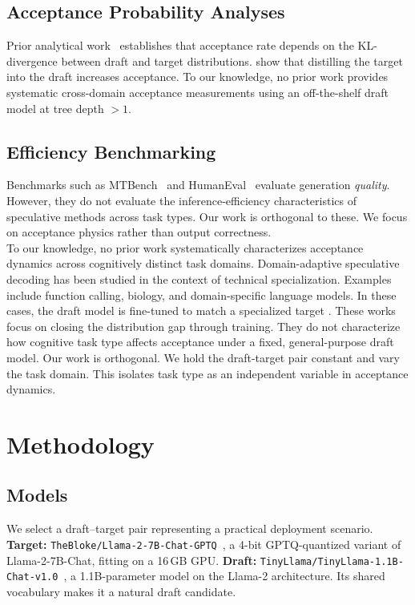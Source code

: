\documentclass[conference]{IEEEtran}
\begin{document}
\subsection{Acceptance Probability Analyses}
Prior analytical work~\cite{leviathan2023,stern2018blockwise} establishes
that acceptance rate depends on the KL-divergence between draft and target
distributions. \citet{zhou2024distillspec} show that distilling the target
into the draft increases acceptance. To our knowledge, no prior work provides
systematic cross-domain acceptance measurements using an off-the-shelf draft
model at tree depth $> 1$.

\subsection{Efficiency Benchmarking}
Benchmarks such as MTBench~\cite{zheng2023judging} and HumanEval~\cite{chen2021evaluating} evaluate generation \emph{quality}. However, they do not evaluate the inference-efficiency characteristics of speculative methods across task types. Our work is orthogonal to these. We focus on acceptance physics rather than output correctness.
\\

To our knowledge, no prior work systematically characterizes acceptance dynamics
across cognitively distinct task domains. Domain-adaptive speculative decoding has been studied in the context of technical specialization. Examples include function calling, biology, and domain-specific language models. In these cases, the draft model is fine-tuned to match a specialized target \cite{hu2025training}. These works focus on closing the distribution gap through training. They do not characterize how cognitive task type affects acceptance under a fixed, general-purpose draft model. Our work is orthogonal. We hold the draft-target pair constant and vary the task domain. This isolates task type as an independent variable in acceptance dynamics.

\section{Methodology}

\subsection{Models}
We select a draft--target pair representing a practical deployment scenario.
\textbf{Target:} \texttt{TheBloke/\allowbreak Llama-2-7B-\allowbreak Chat-GPTQ}~\cite{touvron2023llama},
a 4-bit GPTQ-quantized variant of Llama-2-7B-Chat, fitting on a 16\,GB GPU.
\textbf{Draft:} \texttt{TinyLlama/\allowbreak TinyLlama-1.1B-\allowbreak Chat-v1.0}~\cite{zhang2024tinyllama},
a 1.1B-parameter model on the Llama-2 architecture. Its shared vocabulary makes it a natural draft candidate.
\end{document}
